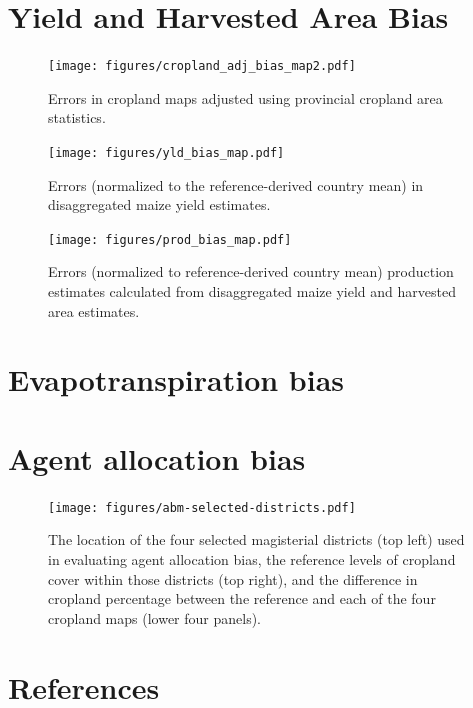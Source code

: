 \documentclass[12pt]{iopart}
\begin{document}


\FloatBarrier



\section*{Yield and Harvested Area Bias}
\begin{figure}[ht]
  \centering
     \texttt{[image: figures/cropland\_adj\_bias\_map2.pdf]} 
      \caption{Errors in cropland maps adjusted using provincial cropland area statistics.}
      \label{fig:default}
\end{figure}

\FloatBarrier


\clearpage
\begin{figure}[ht]
  \centering
     \texttt{[image: figures/yld\_bias\_map.pdf]} 
      \caption{Errors (normalized to the reference-derived country mean) in disaggregated maize yield estimates.}
      \label{fig:default}
\end{figure}

\begin{figure}[ht]
  \centering
     \texttt{[image: figures/prod\_bias\_map.pdf]} 
      \caption{Errors (normalized to reference-derived country mean) production estimates calculated from disaggregated maize yield and harvested area estimates.}
      \label{fig:default}
\end{figure}

\FloatBarrier


\section*{Evapotranspiration bias}


\section*{Agent allocation bias}

\begin{figure}[ht]
  \centering
     \texttt{[image: figures/abm-selected-districts.pdf]} 
      \caption{The location of the four selected magisterial districts (top left) used in evaluating agent allocation bias, the reference levels of cropland cover within those districts (top right), and the difference in cropland percentage between the reference and each of the four cropland maps (lower four panels). }
      \label{fig:default}
\end{figure}



\FloatBarrier
\section*{References}

\end{document}
